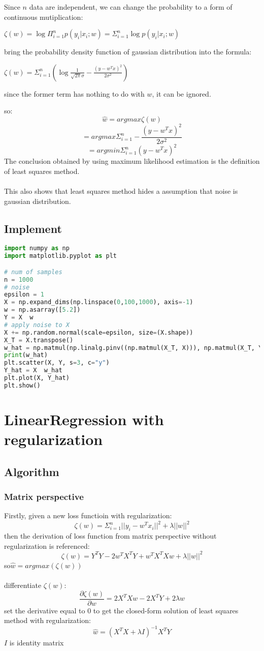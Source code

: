 \documentclass{report}
\begin{document}
Since $n$ data are independent, we can change the probability to a form of continuous mutiplication:

$\zeta(w)=\log{\Pi_{i=1}^np(y_i|x_i;w)}=\Sigma_{i=1}^n \log{p(y_i|x_i;w)}$

bring the probability density function of gaussian distribution into the formula:

$\zeta(w)=\Sigma_{i=1}^n(\log{\frac{1}{\sqrt{2\pi}\sigma}}-\frac{(y-w^Tx)^2}{2\sigma^2})$

since the former term has nothing to do with $w$, it can be ignored.

so:
$$
\hat{w}=argmax{\zeta(w)}
$$
$$
=argmax{ \Sigma_{i=1}^n -\frac{(y-w^Tx)^2}{2\sigma^2}}
$$
$$
=argmin{ \Sigma_{i=1}^n (y-w^Tx)^2}
$$
The conclusion obtained by using maximum likelihood estimation is the definition of least squares method.\\\\
This also shows that least squares method hides a assumption that noise is gaussian distribution.
\subsection{Implement}
\begin{lstlisting}[language={python}]
%matplotlib inline
import numpy as np
import matplotlib.pyplot as plt

# num of samples
n = 1000
# noise
epsilon = 1
X = np.expand_dims(np.linspace(0,100,1000), axis=-1)
w = np.asarray([5.2])
Y = X  w
# apply noise to X
X += np.random.normal(scale=epsilon, size=(X.shape))
X_T = X.transpose()
w_hat = np.matmul(np.linalg.pinv((np.matmul(X_T, X))), np.matmul(X_T, Y))
print(w_hat)
plt.scatter(X, Y, s=3, c="y")
Y_hat = X  w_hat
plt.plot(X, Y_hat)
plt.show()
\end{lstlisting}
\newpage
\section{LinearRegression with regularization}
\subsection{Algorithm}
\subsubsection{Matrix perspective}
Firstly, given a new loss functioin with regularization:
$$
\zeta(w)=\Sigma_{i=1}^{n}||y_i-w^T  x_i||^2 + \lambda  ||w||^2
$$
then the derivation of loss function from matrix perspective without regularization is referenced:
$$
\zeta(w)=Y^TY-2w^TX^TY+w^TX^TX w+\lambda  ||w||^2
$$
so$\hat{w}=argmax(\zeta(w))$\\\\
differentiate $\zeta(w)$:
$$
\frac{\partial \zeta(w)}{\partial w}=2X^TXw-2X^T Y+2\lambda  w 
$$
set the derivative equal to 0 to get the closed-form solution of least squares method with regularization:
$$
\hat{w}=(X^TX+\lambda  I)^{-1} X^TY
$$
$I$ is identity matrix
\end{document}
